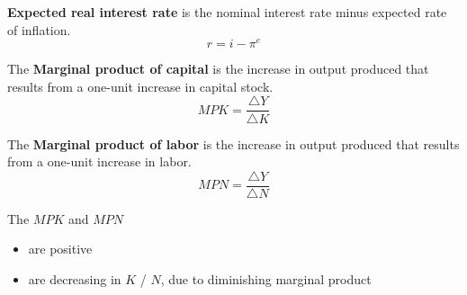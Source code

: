 \documentclass[letterpaper, 9pt,landscape]{extarticle}
\begin{document}
\begin{multicols*}{5}
\begin{definition}
    \textbf{Expected real interest rate} is the nominal interest rate minus expected rate of inflation. 
    \[
        r = i - \pi^e
    \]
\end{definition}

\begin{definition}
    The \textbf{Marginal product of capital} is the increase in output produced that results from a one-unit increase in capital stock. 
    \[
        MPK = \frac{\triangle Y}{\triangle K}
    \]
\end{definition}

\begin{definition}
    The \textbf{Marginal product of labor} is the increase in output produced that results from a one-unit increase in labor. 
    \[
        MPN = \frac{\triangle Y}{\triangle N}
    \]
\end{definition}

\begin{remark}
    The $MPK$ and $MPN$
    \begin{itemize}
        \item are positive 
        \item are decreasing in $K$ / $N$, due to diminishing marginal product
    \end{itemize} 
\end{remark}


\end{multicols*}
\end{document}
